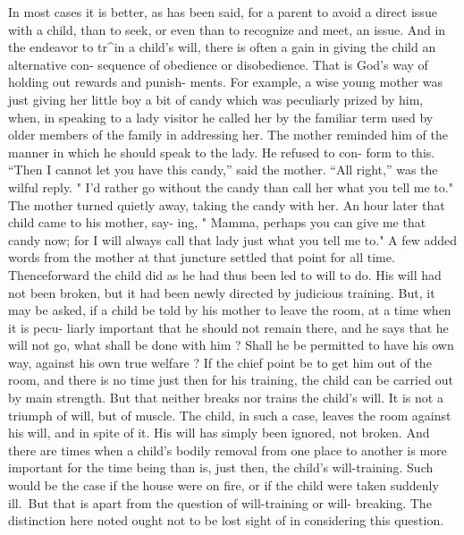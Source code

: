 \documentclass[
]{book}
\begin{document}
In most cases it is better, as has been said, for a parent to avoid a direct issue with a child, than to seek, or even than to recognize and meet, an issue. And in the endeavor to tr\^{}in a child's will, there is often a gain in giving the child an alternative con- sequence of obedience or disobedience. That is God's way of holding out rewards and punish- ments. For example, a wise young mother was just giving her little boy a bit of candy which was peculiarly prized by him, when, in speaking to a lady visitor he called her by the familiar term used by older members of the family in addressing her. The mother reminded him of the manner in which he should speak to the lady. He refused to con- form to this. ``Then I cannot let you have this candy,'' said the mother. ``All right,'' was the wilful reply. " I'd rather go without the candy than call her what you tell me to." The mother turned quietly away, taking the candy with her. An hour later that child came to his mother, say- ing, " Mamma, perhaps you can give me that candy now; for I will always call that lady just what you tell me to." A few added words from the mother at that juncture settled that point for all time. Thenceforward the child did as he had thus been led to will to do. His will had not been broken, but it had been newly directed by judicious training. But, it may be asked, if a child be told by his mother to leave the room, at a time when it is pecu- liarly important that he should not remain there, and he says that he will not go, what shall be done with him ? Shall he be permitted to have his own way, against his own true welfare ? If the chief point be to get him out of the room, and there is no time just then for his training, the child can be carried out by main strength. But that neither breaks nor trains the child's will. It is not a triumph of will, but of muscle. The child, in such a case, leaves the room against his will, and in spite of it. His will has simply been ignored, not broken. And there are times when a child's bodily removal from one place to another is more important for the time being than is, just then, the child's will-training. Such would be the case if the house were on fire, or if the child were taken suddenly ill.~But that is apart from the question of will-training or will- breaking. The distinction here noted ought not to be lost sight of in considering this question.
\end{document}

